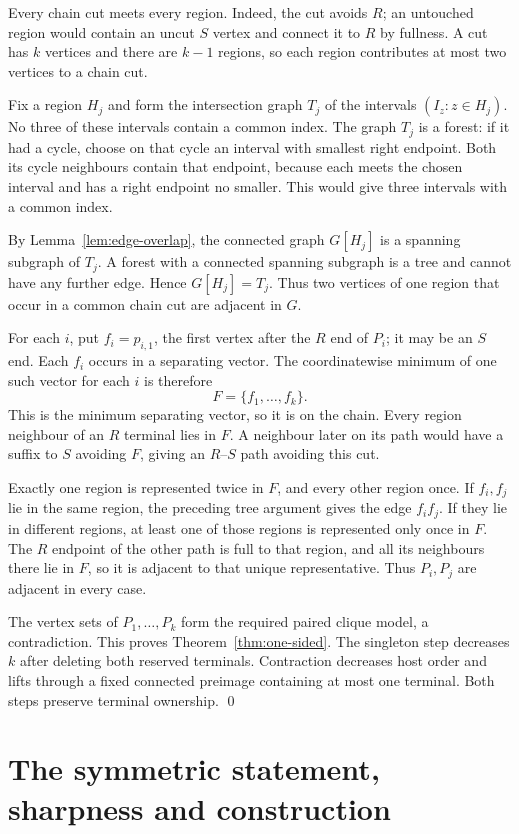 \documentclass[11pt]{amsart}
\begin{document}
Every chain cut meets every region. Indeed, the cut avoids $R$; an
untouched region would contain an uncut $S$ vertex and connect it to
$R$ by fullness. A cut has $k$ vertices and there are $k-1$ regions,
so each region contributes at most two vertices to a chain cut.

Fix a region $H_j$ and form the intersection graph $T_j$ of the
intervals $(I_z:z\in H_j)$. No three of these intervals contain a
common index. The graph $T_j$ is a forest: if it had a cycle, choose
on that cycle an interval with smallest right endpoint. Both its
cycle neighbours contain that endpoint, because each meets the chosen
interval and has a right endpoint no smaller. This would give three
intervals with a common index.

By Lemma~\ref{lem:edge-overlap}, the connected graph $G[H_j]$ is a
spanning subgraph of $T_j$. A forest with a connected spanning subgraph
is a tree and cannot have any further edge. Hence $G[H_j]=T_j$.
Thus two vertices of one region that occur in a common chain cut
are adjacent in $G$.

For each $i$, put $f_i=p_{i,1}$, the first vertex after the $R$ end
of $P_i$; it may be an $S$ end. Each $f_i$ occurs in a separating
vector. The coordinatewise minimum of one such vector for each $i$
is therefore
\[
 F=\{f_1,\ldots,f_k\}.
\]
This is the minimum separating vector, so it is on the chain.
Every region neighbour of an $R$ terminal lies in $F$. A neighbour
later on its path would have a suffix to $S$ avoiding $F$, giving
an $R$--$S$ path avoiding this cut.

Exactly one region is represented twice in $F$, and every other
region once. If $f_i,f_j$ lie in the same region, the preceding
tree argument gives the edge $f_if_j$. If they lie in different
regions, at least one of those regions is represented only once in
$F$. The $R$ endpoint of the other path is full to that region,
and all its neighbours there lie in $F$, so it is adjacent to that
unique representative. Thus $P_i,P_j$ are adjacent in every case.

The vertex sets of $P_1,\ldots,P_k$ form the required paired clique
model, a contradiction. This proves Theorem~\ref{thm:one-sided}.
The singleton step decreases $k$ after deleting both reserved terminals.
Contraction decreases host order and lifts through a fixed connected
preimage containing at most one terminal. Both steps preserve terminal
ownership. \qed

\section{The symmetric statement, sharpness and construction}
\label{sec:consequences}
\end{document}
